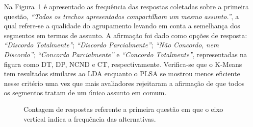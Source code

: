 Na Figura~\ref{fig:Q1} é apresentado as frequência das respostas coletadas sobre a primeira questão, \textit{``Todos os trechos apresentados compartilham um mesmo assunto.''}, a qual refere-se a qualidade do agrupamento levando em conta a semelhança dos segmentos em termos de assunto. A afirmação foi dado como opções de resposta: 
\textit{``Discordo Totalmente''}; 
\textit{``Discordo Parcialmente''}; 
\textit{``Não Concordo, nem Discordo''}; 
\textit{``Concordo Parcialmente''} e 
\textit{``Concordo Totalmente''}, 
representadas na figura como DT, DP, NCND e CT, respectivamente.
Verifica-se que o K-Means tem resultados similares ao LDA enquanto o PLSA se mostrou menos eficiente nesse critério uma vez que mais avaliadores rejeitaram a afirmação de que todos os segmentos tratam de um único assunto em comum. 

\begin{figure}[!h] \centering     %
	\caption{Contagem de respostas referente a primeira questão em que o eixo vertical indica a frequência das alternativas.  }
	\label{fig:Q1}
\end{figure}

